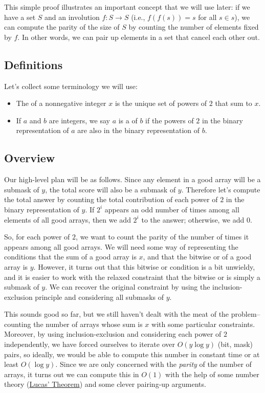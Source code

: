 \documentclass[11pt]{scrartcl}
\begin{document}
\begin{remark}
This simple proof illustrates an important concept that we will use later: 
  if we have a set $S$ and an involution $f : S \to S$ (i.e., $f(f(s)) = s$ for all $s \in s$), we can compute the parity of the size of $S$ by counting the number of elements fixed by $f$.
In other words, we can pair up elements in a set that cancel each other out.
\end{remark}

\subsection{Definitions}

Let's collect some terminology we will use:

\begin{itemize}
  \item The  of a nonnegative integer $x$ is the unique set of powers of $2$ that sum to $x$.
  \item If $a$ and $b$ are integers, we say $a$ is a  of $b$ if the powers of $2$ in the binary representation of $a$ are also in the binary representation of $b$. 
\end{itemize}

\subsection{Overview}
Our high-level plan will be as follows.
Since any element in a good array will be a submask of $y$, the total score will also be a submask of $y$.
Therefore let's compute the total answer by counting the total contribution of each power of $2$ in the binary representation of $y$.
If $2^i$ appears an odd number of times among all elements of all good arrays, then we add $2^i$ to the answer; otherwise, we add $0$.

So, for each power of $2$, we want to count the parity of the number of times it appears among all good arrays.
We will need some way of representing the conditions that the sum of a good array is $x$, and that the bitwise or of a good array is $y$.
However, it turns out that this bitwise or condition is a bit unwieldy, and it is easier to work with the relaxed constraint that the bitwise or is simply a submask of $y$.
We can recover the original constraint by using the inclusion-exclusion principle and considering all submasks of $y$.

This sounds good so far, but we still haven't dealt with the meat of the problem--counting the number of arrays whose sum is $x$ with some particular constraints.
Moreover, by using inclusion-exclusion and considering each power of $2$ independently, we have forced ourselves to iterate over $O(y \log y)$ (bit, mask) pairs, so ideally, we would be able to compute this number in constant time or at least $O(\log y)$.
Since we are only concerned with the \textit{parity} of the number of arrays, it turns out we can compute this in $O(1)$ with the help of some number theory (\href{https://en.wikipedia.org/wiki/Lucas\%27s_theorem}{Lucas' Theorem}) and some clever pairing-up arguments.
\end{document}
